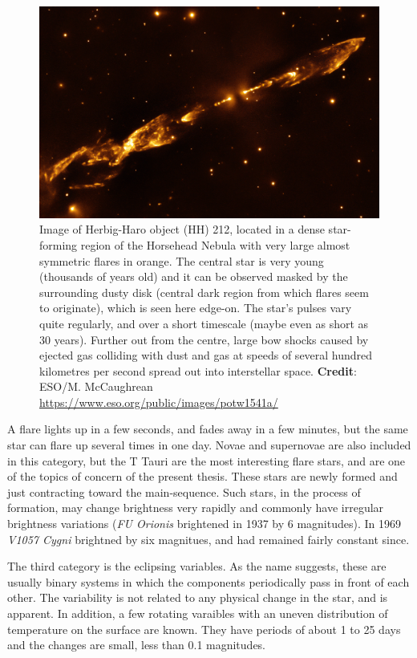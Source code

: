 \begin{figure}[hbt!]
		\centering
		\includegraphics[width=\textwidth]{img/flares-potw1541a}%
  		\caption{Image of Herbig-Haro object (HH) 212, located in a dense star-forming region of the Horsehead Nebula with very large almost symmetric flares in orange. The central star is very young (thousands of years old) and it can be observed masked by the surrounding dusty disk (central dark region from which flares seem to originate), which is seen here edge-on. The star's pulses vary quite regularly, and over a short timescale (maybe even as short as 30 years). Further out from the centre, large bow shocks caused by ejected gas colliding with dust and gas at speeds of several hundred kilometres per second spread out into interstellar space. \textbf{Credit}: ESO/M. McCaughrean \url{https://www.eso.org/public/images/potw1541a/}}
  		\label{fig:flare}
\end{figure}

A flare lights up in a few seconds, and fades away in a few minutes, but the same star can flare up several times in one day. Novae and supernovae are also included in this category, but the T Tauri are the most interesting flare stars, and are one of the topics of concern of the present thesis. These stars are newly formed and just contracting toward the main-sequence. Such stars, in the process of formation, may change brightness very rapidly and commonly have irregular brightness variations (\textit{FU Orionis} brightened in 1937 by 6 magnitudes). In 1969 \textit{V1057 Cygni} brightned by six magnitues, and had remained fairly constant since.

The third category is the eclipsing variables. As the name suggests, these are usually binary systems in which the components periodically pass in front of each other. The variability is not related to any physical change in the star, and is apparent. 
In addition, a few rotating varaibles with an uneven distribution of temperature on the surface are known. They have periods of about 1 to 25 days and the changes are small, less than 0.1 magnitudes.

